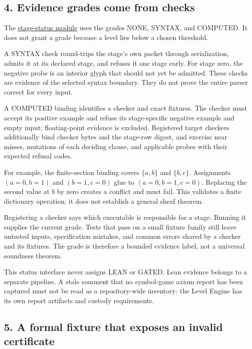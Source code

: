 \documentclass[
  11pt,
]{article}
\begin{document}
\hypertarget{evidence-grades-come-from-checks}{%
\subsection{4. Evidence grades come from
checks}\label{evidence-grades-come-from-checks}}

The
\href{https://github.com/dbccpage/the_symbol_game/blob/52cb5457f6c485ba548cfd292f6012a941ed22cf/research/mssn_sn_tower/code/python/stage_status.py}{stage-status
module} uses the grades NONE, SYNTAX, and COMPUTED. It does not grant a
grade because a level lies below a chosen threshold.

A SYNTAX check round-trips the stage's own packet through serialization,
admits it at its declared stage, and refuses it one stage early. For
stage zero, the negative probe is an interior glyph that should not yet
be admitted. These checks are evidence of the selected syntax boundary.
They do not prove the entire parser correct for every input.

A COMPUTED binding identifies a checker and exact fixtures. The checker
must accept its positive example and refuse its stage-specific negative
example and empty input; floating-point evidence is excluded. Registered
target checkers additionally bind checker bytes and the stage-row
digest, and exercise near misses, mutations of each deciding clause, and
applicable probes with their expected refusal codes.

For example, the finite-section binding covers \(\{a,b\}\) and
\(\{b,c\}\). Assignments \((a=0,b=1)\) and \((b=1,c=0)\) glue to
\((a=0,b=1,c=0)\). Replacing the second value at \(b\) by zero creates a
conflict and must fail. This validates a finite dictionary operation; it
does not establish a general sheaf theorem.

Registering a checker says which executable is responsible for a stage.
Running it supplies the current grade. Tests that pass on a small
fixture family still leave untested inputs, specification mistakes, and
common errors shared by a checker and its fixtures. The grade is
therefore a bounded evidence label, not a universal soundness theorem.

This status interface never assigns LEAN or GATED. Lean evidence belongs
to a separate pipeline. A stale comment that no symbol-game axiom report
has been captured must not be read as a repository-wide inventory: the
Level Engine has its own report artifacts and custody requirements.

\hypertarget{a-formal-fixture-that-exposes-an-invalid-certificate}{%
\subsection{5. A formal fixture that exposes an invalid
certificate}\label{a-formal-fixture-that-exposes-an-invalid-certificate}}
\end{document}
